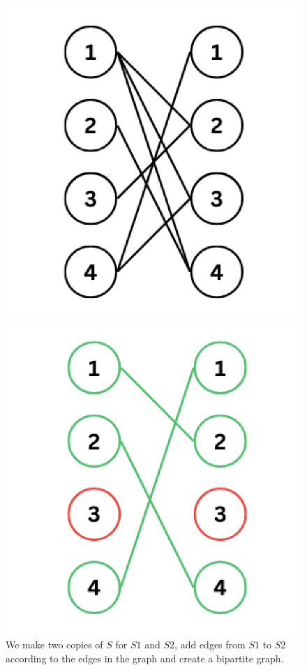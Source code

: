 \documentclass{article}
\begin{document}
\begin{enumerate}
\begin{figure}[H]
\begin{minipage}{0.3\textwidth}
            \includegraphics[width=\textwidth]{image2.png}
            \caption{We make two copies of $S$ for $S1$ and $S2$, add edges from $S1$ to $S2$ according to the edges in the graph and create a bipartite graph.}
        \end{minipage}
        \hspace{0.5cm}
        \begin{minipage}{0.3\textwidth}
            \centering
            \includegraphics[width=\textwidth]{image3.png}

\end{minipage}
\end{figure}
\end{enumerate}
\end{document}
